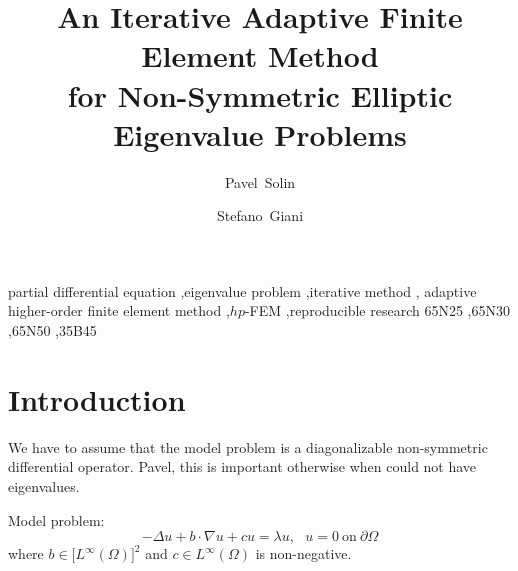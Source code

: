 \documentclass[preprint,12pt]{elsarticle}
\begin{document}
\begin{frontmatter}



\title{An Iterative Adaptive Finite Element Method\\ for Non-Symmetric Elliptic Eigenvalue Problems}


\author[aut1]{Pavel~Solin}

\author[aut2]{Stefano~Giani}


\address[aut1]{Department of Mathematics and Statistics, University of Nevada, Reno, USA, and Institute of Thermo-mechanics,
Prague, Czech Republic}

\address[aut2]{School of Mathematical Sciences
University of Nottingham , University Park, Nottingham, NG7 2RD,  United Kingdom,
Phone: +44 (0) 115 8467916}

\begin{abstract}


\end{abstract}

\begin{keyword}
partial differential equation \sep eigenvalue problem \sep iterative method \sep
adaptive higher-order finite element
method \sep $hp$-FEM \sep reproducible research
\MSC 65N25 \sep 65N30 \sep 65N50 \sep 35B45
\end{keyword}

\end{frontmatter}



\begin{abstract}

\end{abstract}




\section{Introduction}\label{sec:intro}
\setcounter{equation}{0}

We have to assume that the model problem is a diagonalizable non-symmetric differential operator.
Pavel, this is important otherwise when could not have eigenvalues. 

Model problem:
\begin{equation} \label{one}
-\Delta u + b\cdot\nabla u + cu = \lambda u, \ \ \ u = 0 \ \mbox{on} \ \partial \Omega
\end{equation}
where 
$b \in \big[L^\infty(\Omega)\big]^2$ and $c\in L^\infty(\Omega)$ is non-negative.
\end{document}
